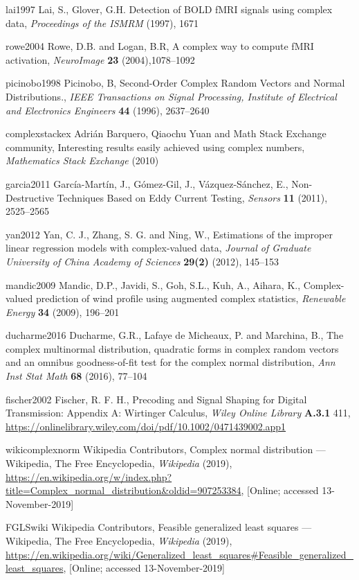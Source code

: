 \documentclass[honours,12pt]{unswthesis}
\numberwithin{equation}{section}
\begin{document}
\begin{thebibliography}{999}

\bibitem
{lai1997} Lai, S., Glover, G.H.
Detection of BOLD fMRI signals using complex data,
\textit{Proceedings of the ISMRM} (1997), 1671

\bibitem %
{rowe2004} Rowe, D.B. and Logan, B.R,
A complex way to compute fMRI activation,
\textit{NeuroImage} \textbf{23} (2004),1078--1092

\bibitem
{picinobo1998} Picinobo, B,
Second-Order Complex Random Vectors and Normal Distributions.,
\textit{IEEE Transactions on Signal Processing, Institute of Electrical and Electronics Engineers} \textbf{44} (1996), 2637--2640

\bibitem %
{complexstackex} Adrián Barquero, Qiaochu Yuan and Math Stack Exchange community,
Interesting results easily achieved using complex numbers,
\textit{Mathematics Stack Exchange} (2010)

\bibitem
{garcia2011} García-Martín, J., Gómez-Gil, J., Vázquez-Sánchez, E.,
Non-Destructive Techniques Based on Eddy Current Testing,
\textit{Sensors} \textbf{11} (2011), 2525--2565

\bibitem
{yan2012} Yan, C. J., Zhang, S. G. and Ning, W.,
Estimations of the improper linear regression models with complex-valued data,
\textit{Journal of Graduate University of China Academy of Sciences} \textbf{29(2)} (2012), 145--153

\bibitem %
{mandic2009} Mandic, D.P., Javidi, S., Goh, S.L., Kuh, A., Aihara, K.,
Complex-valued prediction of wind profile using augmented complex statistics,
\textit{Renewable Energy} \textbf{34} (2009), 196--201

\bibitem 
{ducharme2016} Ducharme, G.R., Lafaye de Micheaux, P. and Marchina, B.,
The complex multinormal distribution, quadratic forms in complex random vectors 
and an omnibus goodness-of-fit test for the complex normal distribution,
\textit{Ann Inst Stat Math} \textbf{68} (2016), 77--104

\bibitem
{fischer2002} Fischer, R. F. H.,
Precoding and Signal Shaping for Digital Transmission: Appendix A: Wirtinger Calculus,
\textit{Wiley Online Library} \textbf{A.3.1} 411,
\url{https://onlinelibrary.wiley.com/doi/pdf/10.1002/0471439002.app1}

\bibitem
{wikicomplexnorm} Wikipedia Contributors,
Complex normal distribution --- {Wikipedia}{,} The Free Encyclopedia,
\textit{Wikipedia} (2019),
\url{https://en.wikipedia.org/w/index.php?title=Complex_normal_distribution&oldid=907253384},
[Online; accessed 13-November-2019]

\bibitem
{FGLSwiki} Wikipedia Contributors,
Feasible generalized least squares --- {Wikipedia}{,} The Free Encyclopedia,
\textit{Wikipedia} (2019),
\url{https://en.wikipedia.org/wiki/Generalized_least_squares#Feasible_generalized_least_squares},
[Online; accessed 13-November-2019]


\end{thebibliography}
\end{document}

